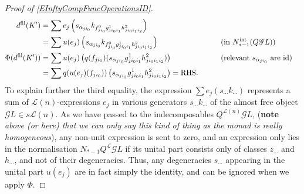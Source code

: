 \documentclass[11pt]{amsart}
\theoremstyle{plain}
\theoremstyle{definition}
\newcommand{\scrQ}{\mathscr{Q}}
\newcommand{\scrR}{\mathscr{R}}
\newcommand{\scrT}{\mathscr{T}}
\newcommand{\scrY}{\mathscr{Y}}
\newcommand{\scrI}{\mathscr{I}}
\newcommand{\scrO}{\mathscr{O}}
\newcommand{\scrP}{\mathscr{P}}
\newcommand{\scrS}{\mathscr{S}}
\newcommand{\scrG}{\mathscr{G}}
\newcommand{\scrH}{\mathscr{H}}
\newcommand{\scrJ}{\mathscr{J}}
\newcommand{\scrK}{\mathscr{K}}
\newcommand{\scrL}{\mathscr{L}}
\newcommand{\scrZ}{\mathscr{Z}}
\newcommand{\scrN}{\mathscr{N}}
\newcommand{\scrM}{\mathscr{M}}
\newcommand{\calL}{\mathcal{L}}
\theoremstyle{plain}
\newcommand{\BSW}{{\scrG}}%
\begin{document}
\begin{Composite functor spectral sequences}
\begin{tricky proofs of operation compatibilities}
\begin{proof}[Proof of \ref{EInftyCompFuncOperationsID}]
\begin{alignat*}{2}
d^\textup{fil}(K')
&=
\sum e_j\left(s_{\alpha_{ji_0}} k_{f^0_{ji_0}g^1_{ji_0i_1}h^2_{ji_0i_1i_2}}\right)%
\\
&=
\sum u(e_j)\left(s_{\alpha_{ji_0}} k_{f^0_{ji_0}g^1_{ji_0i_1}h^2_{ji_0i_1i_2}}\right)%
&\qquad&\text{(in $N_{*-1}^\textup{int}(Q\BSW L)$)}\\
\Phi(d^\textup{fil}(K'))&=
\sum u(e_j)\left( q(f_{ji_0})(s_{\alpha_{ji_0}}g^1_{ji_0i_1}h^2_{ji_0i_1i_2})\right)%
&\qquad&\text{(relevant $s_{\alpha_{ji_0}}$ are $\textup{id}$)}\\
&=
\sum q(u(e_j)(f_{ji_0}))\left(s_{\alpha_{ji_0}} {g^1_{ji_0i_1}h^2_{ji_0i_1i_2}}\right) =\textup{RHS}.
\end{alignat*}
To explain further the third equality,  the expression $\sum e_j(s_{\cdots }k_{\cdots })$ represents a sum of $\calL(n)$-expressions $e_j$ in various generators $s_{\cdots }k_{\cdots }$ of the almost free object $\BSW L\in s\calL(n)$. As we have passed to the indecomposables $Q^{\calL(n)}\BSW L$, (\textbf{note}\emph{ above (or here) that we can only say this kind of thing as the monad is really homogeneous}), any non-unit expression is sent to zero, and an expression only lies in the normalisation $N_{*-1}Q^{\calL}\BSW L$ if its unital part consists only of classes $z_{\cdots}$ and $h_{\cdots }$, and not of their degeneracies. Thus, any degeneracies $s_{\cdots }$ appearing in the unital part $u(e_j)$ are in fact simply the identity, and can be ignored when we apply $\Phi$.
\end{proof}
\end{tricky proofs of operation compatibilities}

\end{Composite functor spectral sequences}
\end{document}
